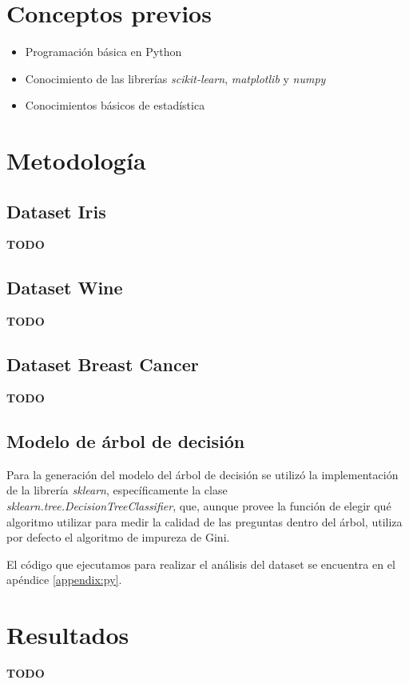 \documentclass[sigconf,authorversion,nonacm]{acmart}
\begin{document}
\section{Conceptos previos}
\begin{itemize}
  \item Programación básica en Python
  \item Conocimiento de las librerías \textit{scikit-learn}, \textit{matplotlib} y \textit{numpy}
  \item Conocimientos básicos de estadística
\end{itemize}


\section{Metodología}

\subsection{Dataset Iris}
\textbf{TODO}

\subsection{Dataset Wine}
\textbf{TODO}

\subsection{Dataset Breast Cancer}
\textbf{TODO}

\subsection{Modelo de árbol de decisión}
Para la generación del modelo del árbol de decisión se utilizó la implementación de la librería \textit{sklearn}, específicamente la clase \\\textit{sklearn.tree.DecisionTreeClassifier}\cite{scikit-learn}, que, aunque provee la función de elegir qué algoritmo utilizar para medir la calidad de las preguntas dentro del árbol, utiliza por defecto el algoritmo de impureza de Gini.

El código que ejecutamos para realizar el análisis del dataset se encuentra en el apéndice \ref{appendix:py}.


\section{Resultados}
\textbf{TODO}
\end{document}
